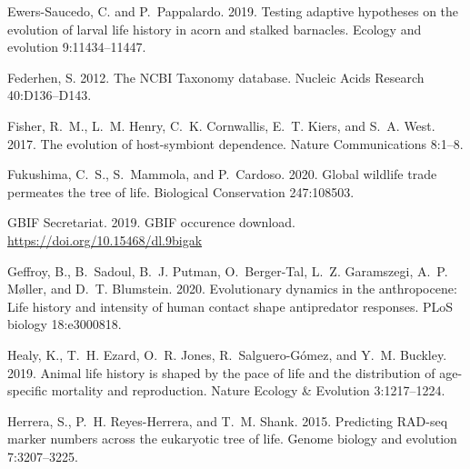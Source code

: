 \documentclass[oupdraft]{sysbio_sse}
\begin{document}
\begin{thebibliography}{49}
Ewers-Saucedo, C. and P.~Pappalardo. 2019. Testing adaptive hypotheses on the
  evolution of larval life history in acorn and stalked barnacles. Ecology and
  evolution 9:11434--11447.

Federhen, S. 2012. The {NCBI} {Taxonomy} database. Nucleic Acids Research
  40:D136--D143.

Fisher, R.~M., L.~M. Henry, C.~K. Cornwallis, E.~T. Kiers, and S.~A. West.
  2017. The evolution of host-symbiont dependence. Nature Communications
  8:1--8.

Fukushima, C.~S., S.~Mammola, and P.~Cardoso. 2020. Global wildlife trade
  permeates the tree of life. Biological Conservation 247:108503.

GBIF Secretariat. 2019. {GBIF} occurence download. \url{https://doi.org/10.15468/dl.9bigak}

Geffroy, B., B.~Sadoul, B.~J. Putman, O.~Berger-Tal, L.~Z. Garamszegi, A.~P.
  M{\o}ller, and D.~T. Blumstein. 2020. Evolutionary dynamics in the
  anthropocene: Life history and intensity of human contact shape antipredator
  responses. PLoS biology 18:e3000818.

Healy, K., T.~H. Ezard, O.~R. Jones, R.~Salguero-G{\'o}mez, and Y.~M. Buckley.
  2019. Animal life history is shaped by the pace of life and the distribution
  of age-specific mortality and reproduction. Nature Ecology \& Evolution
  3:1217--1224.

Herrera, S., P.~H. Reyes-Herrera, and T.~M. Shank. 2015. {Predicting RAD-seq
  marker numbers across the eukaryotic tree of life}. Genome biology and
  evolution 7:3207--3225.


\end{thebibliography}
\end{document}
